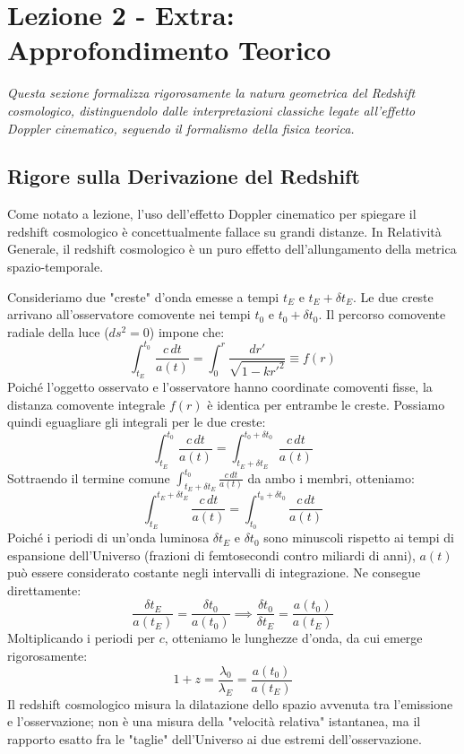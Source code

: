 \documentclass[11pt,a4paper]{report}
\begin{document}
\newpage
\section{Lezione 2 - Extra: Approfondimento Teorico}

\textit{Questa sezione formalizza rigorosamente la natura geometrica del Redshift cosmologico, distinguendolo dalle interpretazioni classiche legate all'effetto Doppler cinematico, seguendo il formalismo della fisica teorica.}

\subsection{Rigore sulla Derivazione del Redshift}
Come notato a lezione, l'uso dell'effetto Doppler cinematico per spiegare il redshift cosmologico è concettualmente fallace su grandi distanze. In Relatività Generale, il redshift cosmologico è un puro effetto dell'allungamento della metrica spazio-temporale.

Consideriamo due "creste" d'onda emesse a tempi $t_E$ e $t_E + \delta t_E$. Le due creste arrivano all'osservatore comovente nei tempi $t_0$ e $t_0 + \delta t_0$. Il percorso comovente radiale della luce ($ds^2 = 0$) impone che:
\begin{equation}
\int_{t_E}^{t_0} \frac{c \, dt}{a(t)} = \int_0^r \frac{dr'}{\sqrt{1-kr'^2}} \equiv f(r)
\end{equation}
Poiché l'oggetto osservato e l'osservatore hanno coordinate comoventi fisse, la distanza comovente integrale $f(r)$ è identica per entrambe le creste. Possiamo quindi eguagliare gli integrali per le due creste:
\begin{equation}
\int_{t_E}^{t_0} \frac{c \, dt}{a(t)} = \int_{t_E+\delta t_E}^{t_0+\delta t_0} \frac{c \, dt}{a(t)}
\end{equation}
Sottraendo il termine comune $\int_{t_E+\delta t_E}^{t_0} \frac{c \, dt}{a(t)}$ da ambo i membri, otteniamo:
\begin{equation}
\int_{t_E}^{t_E+\delta t_E} \frac{c \, dt}{a(t)} = \int_{t_0}^{t_0+\delta t_0} \frac{c \, dt}{a(t)}
\end{equation}
Poiché i periodi di un'onda luminosa $\delta t_E$ e $\delta t_0$ sono minuscoli rispetto ai tempi di espansione dell'Universo (frazioni di femtosecondi contro miliardi di anni), $a(t)$ può essere considerato costante negli intervalli di integrazione. Ne consegue direttamente:
\begin{equation}
\frac{\delta t_E}{a(t_E)} = \frac{\delta t_0}{a(t_0)} \implies \frac{\delta t_0}{\delta t_E} = \frac{a(t_0)}{a(t_E)}
\end{equation}
Moltiplicando i periodi per $c$, otteniamo le lunghezze d'onda, da cui emerge rigorosamente:
\begin{equation}
1 + z = \frac{\lambda_0}{\lambda_E} = \frac{a(t_0)}{a(t_E)}
\end{equation}
Il redshift cosmologico misura la dilatazione dello spazio avvenuta tra l'emissione e l'osservazione; non è una misura della "velocità relativa" istantanea, ma il rapporto esatto fra le "taglie" dell'Universo ai due estremi dell'osservazione.
\end{document}
